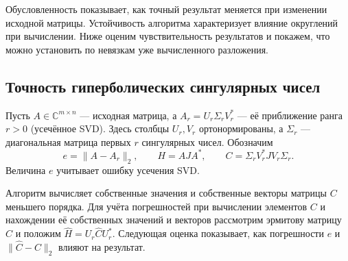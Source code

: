 \documentclass[a4paper,12pt]{article}
\theoremstyle{csstyle}
\newcommand{\HSVDComplex}{\mathbb C}
\begin{document}
Обусловленность показывает, как точный результат меняется при изменении
исходной матрицы. Устойчивость алгоритма характеризует влияние округлений при
вычислении. Ниже оценим чувствительность результатов и покажем,
что можно установить по невязкам уже вычисленного разложения.

\subsection{Точность гиперболических сингулярных чисел}

Пусть $A\in\HSVDComplex^{m\times n}$ --- исходная матрица,
а $A_r=U_r\Sigma_rV_r^*$ --- её приближение ранга $r>0$ (усечённое SVD).
Здесь столбцы $U_r,V_r$ ортонормированы, а $\Sigma_r$ --- диагональная
матрица первых $r$ сингулярных чисел. Обозначим
\[
e=\|A-A_r\|_2,\qquad H=AJA^*,\qquad
C=\Sigma_rV_r^*JV_r\Sigma_r.
\]
Величина $e$ учитывает ошибку усечения SVD.

Алгоритм вычисляет собственные значения и собственные векторы матрицы $C$ меньшего порядка.
Для учёта погрешностей при вычислении элементов $C$ и нахождении её собственных
значений и векторов рассмотрим
эрмитову матрицу $\widehat C$ и положим
$\widehat H=U_r\widehat C U_r^*$.
Следующая оценка показывает, как погрешности $e$ и
$\|\widehat C-C\|_2$ влияют на результат. 
\end{document}
